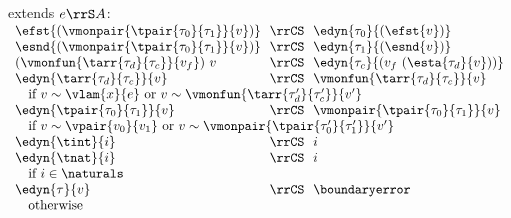 \begin{flushleft}
\begin{minipage}[t]{\columnwidth}
 extends $e \rrS A$:\\
$\begin{array}{l@{~~}c@{~~}l}
  \efst{(\vmonpair{\tpair{\tau_0}{\tau_1}}{v})} & \rrCS & \edyn{\tau_0}{(\efst{v})}
\\
  \esnd{(\vmonpair{\tpair{\tau_0}{\tau_1}}{v})} & \rrCS & \edyn{\tau_1}{(\esnd{v})}
\\
  (\vmonfun{\tarr{\tau_d}{\tau_c}}{v_f})~v & \rrCS & \edyn{\tau_c}{(v_f~(\esta{\tau_d}{v}))}
\\
  \edyn{\tarr{\tau_d}{\tau_c}}{v} & \rrCS & \vmonfun{\tarr{\tau_d}{\tau_c}}{v}
\\ \multicolumn{3}{l}{\mbox{\quad if $v \sim \vlam{x}{e}$ or $v \sim \vmonfun{\tarr{\tau_d'}{\tau_c'}}{v'}$}}
\\
  \edyn{\tpair{\tau_0}{\tau_1}}{v} & \rrCS & \vmonpair{\tpair{\tau_0}{\tau_1}}{v}
\\ \multicolumn{3}{l}{\mbox{\quad if $v \sim \vpair{v_0}{v_1}$ or $v \sim \vmonpair{\tpair{\tau_0'}{\tau_1'}}{v'}$}}
\\
  \edyn{\tint}{i} & \rrCS & i
\\
  \edyn{\tnat}{i} & \rrCS & i
\\ \multicolumn{3}{l}{\mbox{\quad if $i \in \naturals$}}
\\
  \edyn{\tau}{v} & \rrCS & \boundaryerror
\\ \multicolumn{3}{l}{\mbox{\quad otherwise}}
\end{array}$
\end{minipage}

\end{flushleft}
